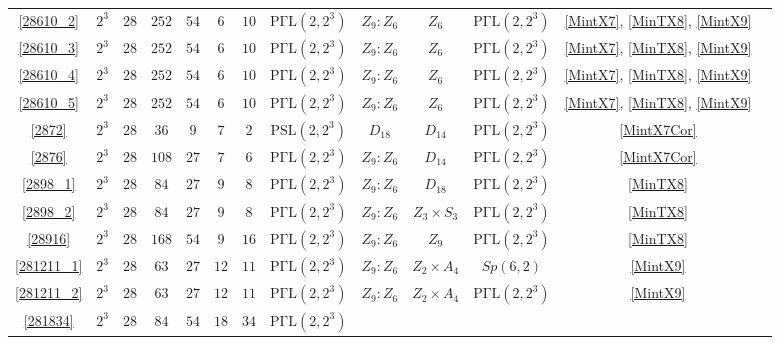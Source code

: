 \documentclass[a4paper,twopage,reqno,12pt]{amsart}
\theoremstyle{definition}
\numberwithin{equation}{section}
\newcommand{\PSL}{\mathrm{PSL}}
\newcommand{\PGaL}{\mathrm{P\Gamma L}}
\begin{document}
\begin{table}
{\begin{tabular}{ccccccccccccc}
 \ref{28610_2} & $2 ^3$ & $28$  & $252$  & $54$  & $6$  & $10$      & $\PGaL(2,2^{3}) $  &
			$Z_{9} : Z_{6}$          & $Z_{6}$             & $\PGaL(2,2^{3}) $     & \ref{MintX7}, \ref{MinTX8}, \ref{MintX9}\\
 \ref{28610_3}& $2 ^3$ & $28$  & $252$  & $54$  & $6$  & $10$      & $\PGaL(2,2^{3}) $  &
			$Z_{9} : Z_{6}$          & $Z_{6}$             & $\PGaL(2,2^{3}) $     & \ref{MintX7}, \ref{MinTX8}, \ref{MintX9} \\
 \ref{28610_4}& $2 ^3$ & $28$  & $252$  & $54$  & $6$  & $10$      & $\PGaL(2,2^{3}) $  &
			$Z_{9} : Z_{6}$          & $Z_{6}$             & $\PGaL(2,2^{3}) $     & \ref{MintX7}, \ref{MinTX8}, \ref{MintX9} \\
 \ref{28610_5}& $2 ^3$ & $28$  & $252$  & $54$  & $6$  & $10$      & $\PGaL(2,2^{3}) $  &
			$Z_{9} : Z_{6}$          & $Z_{6}$             & $\PGaL(2,2^{3}) $     & \ref{MintX7}, \ref{MinTX8}, \ref{MintX9} \\
 \ref{2872}& $2 ^3$ & $28$  & $36$  & $9$  & $7$  & $2$      & $\PSL(2,2^{3}) $  &
			$D_{18}$          & $D_{14}$             & $\PGaL(2,2^{3}) $     & \ref{MintX7Cor}\\     
\ref{2876}& $2 ^3$ & $28$  & $108$  & $27$  & $7$  & $6$      & $\PGaL(2,2^{3}) $  &
			$Z_{9}:Z_{6}$          & $D_{14}$             & $\PGaL(2,2^{3}) $     & \ref{MintX7Cor}\\    
 \ref{2898_1}& $2 ^3$ & $28$  & $84$   & $27$  & $9$  & $8$       & $\PGaL(2,2^{3}) $  &
			$Z_{9} : Z_{6}$          & $D_{18}$            & $\PGaL(2,2^{3}) $     & \ref{MinTX8} \\
 \ref{2898_2}& $2 ^3$ & $28$  & $84$   & $27$  & $9$  & $8$       & $\PGaL(2,2^{3}) $  &
			$Z_{9} : Z_{6}$          & $Z_{3} \times S_{3}$        & $\PGaL(2,2^{3}) $     & \ref{MinTX8} \\
 \ref{28916}& $2 ^3$ & $28$  & $168$  & $54$  & $9$  & $16$      & $\PGaL(2,2^{3}) $  & 
			$Z_{9} : Z_{6}$          & $Z_{9}$             & $\PGaL(2,2^{3}) $     & \ref{MinTX8} \\ \ref{281211_1}& $2 ^3$ & $28$  & $63$   & $27$  & $12$ & $11$      & $\PGaL(2,2^{3}) $  &
			$Z_{9} : Z_{6}$          & $Z_{2} \times A_{4}$        & $Sp(6,2)$            & \ref{MintX9} \\
 \ref{281211_2}& $2 ^3$ & $28$  & $63$   & $27$  & $12$ & $11$      & $\PGaL(2,2^{3}) $  &
			$Z_{9} : Z_{6}$          & $Z_{2} \times A_{4}$        & $\PGaL(2,2^{3}) $     & \ref{MintX9} \\
 \ref{281834}& $2 ^3$ & $28$  & $84$   & $54$  & $18$ & $34$      & $\PGaL(2,2^{3}) $  &

\end{tabular}}
\end{table}
\end{document}
